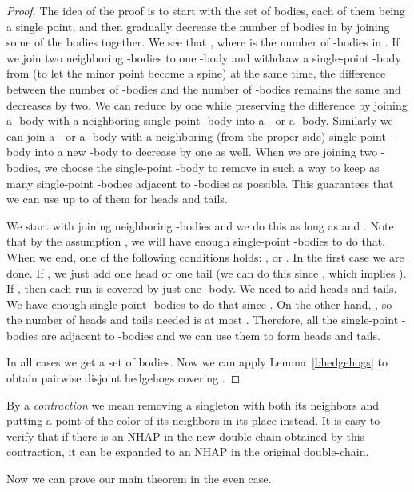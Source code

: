 \documentclass[12pt]{article}
\begin{document}
\begin{proof}
The idea of the proof is to start with the set  of 
bodies, each of them being a single point, and then gradually decrease the 
number of bodies in  by joining some of the bodies together.
We see that , where  is the number of
-bodies in . If we join two neighboring -bodies to one
-body and withdraw a single-point -body from  (to let the
minor point become a spine) at the same time, the difference between the number
of -bodies and the number of -bodies remains the same and
 decreases by two. We can reduce  by one
while preserving the difference 
by joining a -body with a neighboring single-point
-body into a - or a -body. Similarly we can join a - or
a -body with a neighboring (from the proper side) single-point -body
into a new -body to decrease  by one as well. When we are
joining two -bodies, we choose the single-point -body to remove in such
a way to keep as many single-point -bodies adjacent to -bodies as
possible. This guarantees that we can use up to  of them for heads and
tails.

We start with joining neighboring -bodies and we do this as long as
 and . Note that by the assumption 
, we will have enough single-point -bodies to do that.
When we end, one of the following conditions holds: ,
 or . In the first case we are done. If
, we just add one head or one tail (we can do this since
, which implies
). If , then each run is covered by just one -body.
We need to add  heads and tails. We have enough
single-point -bodies to do that since 
.
On the other hand, , so the number of heads and
tails needed is at most . Therefore, all the single-point -bodies are
adjacent to -bodies and we can use them to form heads and tails.

In all cases we get a set  of  bodies. Now we can apply
Lemma~\ref{l:hedgehogs} to obtain  pairwise disjoint hedgehogs covering
.
\end{proof}

\bigskip

By a {\em contraction\/} we mean removing a singleton with both its
neighbors and putting a point of the color of its neighbors in its place
instead. It is easy to verify that if there is an NHAP in the new
double-chain obtained by this contraction, it can be expanded to an NHAP
in the original double-chain.

Now we can prove our main theorem in the even case.

\bigskip
\end{document}
